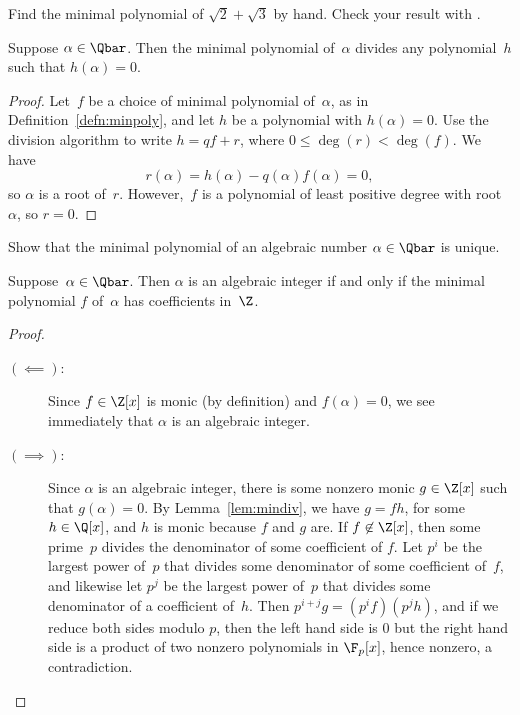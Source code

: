 \begin{exercise}
	Find the minimal polynomial of $\sqrt{2} + \sqrt{3}$ by hand.
	Check your result with \sage{}.
\end{exercise}

\begin{lemma}\label{lem:mindiv}
	Suppose $\alpha \in\Qbar$.  Then the minimal polynomial of~$\alpha$
	divides any polynomial~$h$ such that $h(\alpha)=0$.
\end{lemma}
\begin{proof}
	Let~$f$ be a choice of minimal polynomial of~$\alpha$, as in
	Definition~\ref{defn:minpoly}, and let $h$ be a polynomial with
	$h(\alpha)=0$.  Use the division algorithm to write $h=qf + r$,
	where $0\leq \deg(r) < \deg(f)$.  We have $$r(\alpha) = h(\alpha) -
	q(\alpha) f(\alpha) = 0,$$ so $\alpha$ is a root of~$r$.
	However,~$f$ is a polynomial of least positive degree with
	root~$\alpha$, so $r=0$.
\end{proof}

\begin{exercise}
	Show that the minimal polynomial of an algebraic number
	$\alpha\in\Qbar$ is unique.
\end{exercise}

\begin{lemma}
	\label{lem:minpolint}
	Suppose~$\alpha \in\Qbar$. Then $\alpha$ is an algebraic integer if
	and only if the minimal polynomial $f$ of~$\alpha$ has coefficients
	in~$\Z$.
\end{lemma}
\begin{proof}
	\hfill
	\begin{description}
		\item[$(\impliedby)$:]
			Since $f\in \Z[x]$ is monic (by definition) and $f(\alpha)=0$,
			we see immediately that $\alpha$ is an algebraic integer.
		\item[$(\implies)$:]
			Since $\alpha$ is an algebraic integer, there is
			some nonzero monic $g\in\Z[x]$ such that $g(\alpha)=0$.
			By Lemma~\ref{lem:mindiv}, we have $g=fh$, for some $h\in\Q[x]$,
			and $h$ is monic because $f$ and $g$ are.  If $f\not\in\Z[x]$,
			then some prime~$p$ divides the denominator of some coefficient
			of $f$.  Let $p^i$ be the largest power of~$p$ that divides some 
			denominator of some coefficient of~$f$, and likewise let $p^j$ be
			the largest power of~$p$ that divides some denominator of a 
			coefficient of~$h$.  Then $p^{i+j}g = (p^if)(p^j h)$, and if we 
			reduce both sides modulo $p$, then the left hand side is $0$ but 
			the right hand side is a product of two nonzero polynomials in 
			$\F_p[x]$, hence nonzero, a contradiction.
	\end{description}
\end{proof}

